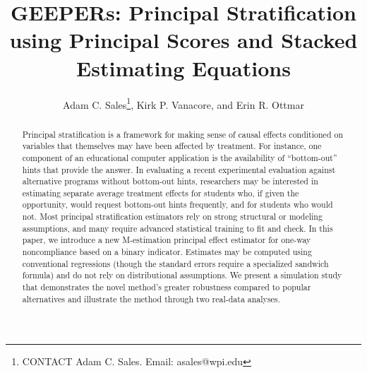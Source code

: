 \documentclass[]{article}
\begin{document}



\title{GEEPERs: Principal Stratification using Principal Scores and Stacked Estimating Equations}

 \author{
 Adam C. Sales\thanks{CONTACT Adam C. Sales. Email: asales@wpi.edu}, Kirk P. Vanacore, and Erin R. Ottmar%
}



\maketitle


\begin{abstract}
Principal stratification is a framework for making sense of causal effects conditioned on variables that themselves may have been affected by treatment. For instance, one component of an educational computer application is the availability of “bottom-out” hints that provide the answer. In evaluating a recent experimental evaluation against alternative programs without bottom-out hints, researchers may be interested in estimating separate average treatment effects for students who, if given the opportunity, would request bottom-out hints frequently, and for students who would not. Most principal stratification estimators rely on strong structural or modeling assumptions, and many require advanced statistical training to fit and check. In this paper, we introduce a new M-estimation principal effect estimator for one-way noncompliance based on a binary indicator. Estimates may be computed using conventional regressions (though the standard errors require a specialized sandwich formula) and do not rely on distributional assumptions. We present a simulation study that demonstrates the novel method's greater robustness compared to popular alternatives and illustrate the method through two real-data analyses.
\end{abstract}
\end{document}
